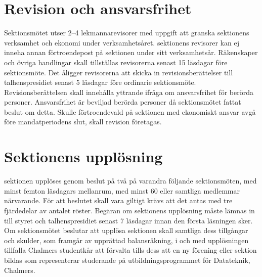 \documentclass[a4paper]{dtek}
\begin{document}
\section{Revision och ansvarsfrihet}
\para[Revisorer] Sektionsmötet utser 2–4 lekmannarevisorer med uppgift att granska sektionens verksamhet och ekonomi under verksamhetsåret.
\stycke sektionens revisorer kan ej inneha annan förtroendepost på sektionen under sitt verksamhetsår.
\stycke Räkenskaper och övriga handlingar skall tillställas revisorerna senast 15 läsdagar före sektionsmöte.
\para[Åligganden] Det åligger revisorerna att skicka in revisionsberättelser till talhenspresidiet senast 5 läsdagar före ordinarie sektionsmöte.
\stycke Revisionsberättelsen skall innehålla yttrande ifråga om ansvarsfrihet för berörda personer.
\para[Ansvarsfrihet] Ansvarsfrihet är beviljad berörda personer då sektionsmötet fattat beslut om detta.
\stycke Skulle förtroendevald på sektionen med ekonomiskt ansvar avgå före mandatperiodens slut, skall revision företagas.

\section{Sektionens upplösning}
 sektionen upplöses genom beslut på två på varandra följande sektionsmöten, med minst femton läsdagars mellanrum, med minst 60 eller samtliga medlemmar närvarande. För att beslutet skall vara giltigt krävs att det antas med tre fjärdedelar av antalet röster. Begäran om sektionens upplösning måste lämnas in till styret och talhenspresidiet senast 7 läsdagar innan den första läsningen sker.
 Om sektionsmötet beslutar att upplösa sektionen skall samtliga dess tillgångar och skulder, som framgår av upprättad balansräkning, i och med upplösningen tillfalla Chalmers studentkår att förvalta tills dess att en ny förening eller sektion bildas som representerar studerande på utbildningsprogrammet för Datateknik, Chalmers.
\end{document}
